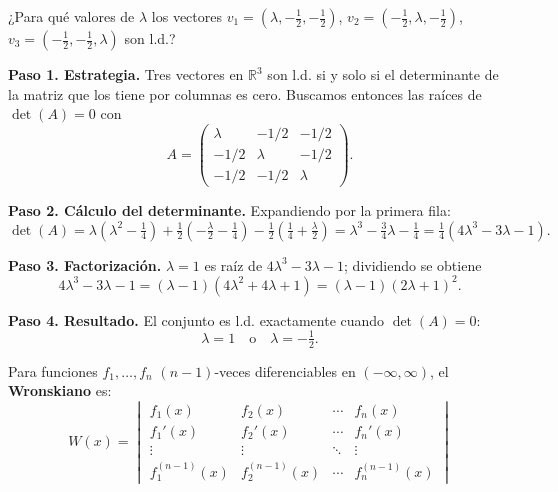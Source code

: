 \begin{example}
¿Para qué valores de $\lambda$ los vectores $v_1=(\lambda,-\frac{1}{2},-\frac{1}{2})$, $v_2=(-\frac{1}{2},\lambda,-\frac{1}{2})$, $v_3=(-\frac{1}{2},-\frac{1}{2},\lambda)$ son l.d.?

\begin{myproof}
\textbf{Paso 1. Estrategia.} Tres vectores en $\mathbb{R}^3$ son l.d. si y solo si el determinante de la matriz que los tiene por columnas es cero. Buscamos entonces las raíces de $\det(A)=0$ con
$$A = \begin{pmatrix}
\lambda & -1/2 & -1/2 \\
-1/2 & \lambda & -1/2 \\
-1/2 & -1/2 & \lambda
\end{pmatrix}.$$

\textbf{Paso 2. Cálculo del determinante.} Expandiendo por la primera fila:
$$\det(A) = \lambda\left(\lambda^2-\tfrac{1}{4}\right) + \tfrac{1}{2}\left(-\tfrac{\lambda}{2}-\tfrac{1}{4}\right) - \tfrac{1}{2}\left(\tfrac{1}{4}+\tfrac{\lambda}{2}\right) = \lambda^3 - \tfrac{3}{4}\lambda - \tfrac{1}{4} = \tfrac{1}{4}(4\lambda^3 - 3\lambda - 1).$$

\textbf{Paso 3. Factorización.} $\lambda=1$ es raíz de $4\lambda^3-3\lambda-1$; dividiendo se obtiene
$$4\lambda^3 - 3\lambda - 1 = (\lambda-1)(4\lambda^2+4\lambda+1) = (\lambda-1)(2\lambda+1)^2.$$

\textbf{Paso 4. Resultado.} El conjunto es l.d. exactamente cuando $\det(A)=0$:
$$\boxed{\lambda = 1 \quad \text{o} \quad \lambda = -\tfrac{1}{2}.}$$
\end{myproof}
\end{example}

\begin{definition}[Wronskiano]
Para funciones $f_1,\dots,f_n$ $(n-1)$-veces diferenciables en $(-\infty, \infty)$, el \textbf{Wronskiano} es:
$$W(x) = \begin{vmatrix} 
f_1(x) & f_2(x) & \cdots & f_n(x) \\
f_1'(x) & f_2'(x) & \cdots & f_n'(x) \\
\vdots & \vdots & \ddots & \vdots \\
f_1^{(n-1)}(x) & f_2^{(n-1)}(x) & \cdots & f_n^{(n-1)}(x) 
\end{vmatrix}$$
\end{definition}

